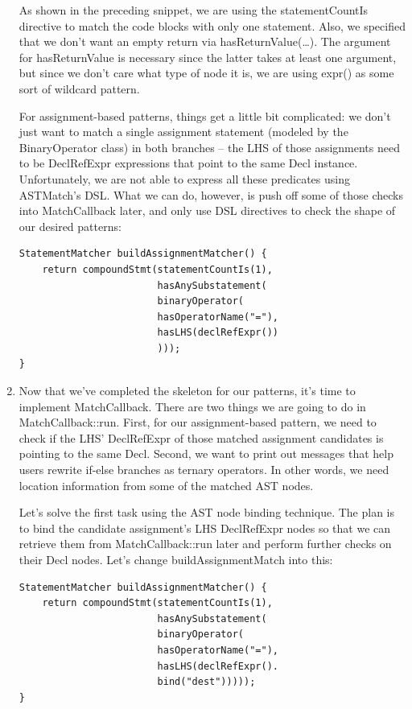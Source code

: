 \begin{enumerate}
As shown in the preceding snippet, we are using the statementCountIs directive to match the code blocks with only one statement. Also, we specified that we don't want an empty return via  hasReturnValue(…). The argument for hasReturnValue is necessary since the latter takes at least one argument, but since we don't care what type of node it is, we are using expr() as some sort of wildcard pattern.

For assignment-based patterns, things get a little bit complicated: we don't just want to match a single assignment statement (modeled by the BinaryOperator class) in both branches – the LHS of those assignments need to be DeclRefExpr expressions that point to the same Decl instance. Unfortunately, we are not able to express all these predicates using ASTMatch's DSL. What we can do, however, is push off some of those checks into MatchCallback later, and only use DSL directives to check the shape of our desired patterns:

\begin{lstlisting}[style=styleCXX]
StatementMatcher buildAssignmentMatcher() {
	return compoundStmt(statementCountIs(1),
						hasAnySubstatement(
						binaryOperator(
						hasOperatorName("="),
						hasLHS(declRefExpr())
						)));
}
\end{lstlisting}

\item Now that we've completed the skeleton for our patterns, it's time to implement MatchCallback. There are two things we are going to do in MatchCallback::run. First, for our assignment-based pattern, we need to check if the LHS' DeclRefExpr of those matched assignment candidates is pointing to the same Decl. Second, we want to print out messages that help users rewrite if-else branches as ternary operators. In other words, we need location information from some of the matched AST nodes.

Let's solve the first task using the AST node binding technique. The plan is to bind the candidate assignment's LHS DeclRefExpr nodes so that we can retrieve them from MatchCallback::run later and perform further checks on their Decl nodes. Let's change buildAssignmentMatch into this:

\begin{lstlisting}[style=styleCXX]
StatementMatcher buildAssignmentMatcher() {
	return compoundStmt(statementCountIs(1),
						hasAnySubstatement(
						binaryOperator(
						hasOperatorName("="),
						hasLHS(declRefExpr().
						bind("dest")))));
}
\end{lstlisting}


\end{enumerate}
